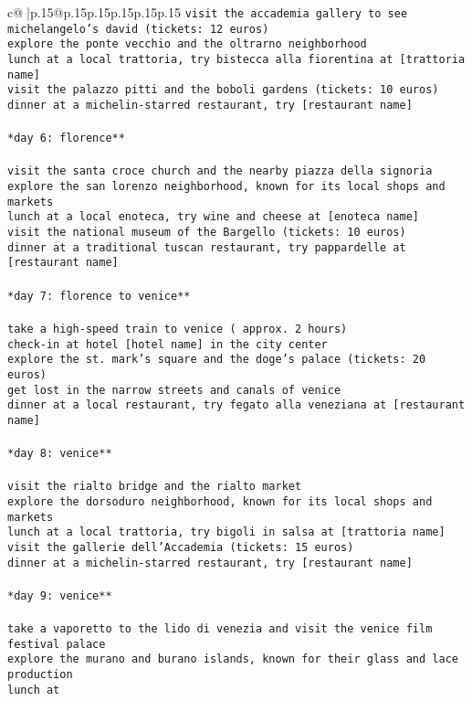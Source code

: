 \documentclass{article}
\begin{document}
{\begin{supertabular}{c@{$\;$}|p{.15\linewidth}@{}p{.15\linewidth}p{.15\linewidth}p{.15\linewidth}p{.15\linewidth}p{.15\linewidth}}
{{{\tt * visit the accademia gallery to see michelangelo's david (tickets: 12 euros)\\ \tt * explore the ponte vecchio and the oltrarno neighborhood\\ \tt * lunch at a local trattoria, try bistecca alla fiorentina at [trattoria name]\\ \tt * visit the palazzo pitti and the boboli gardens (tickets: 10 euros)\\ \tt * dinner at a michelin-starred restaurant, try [restaurant name]\\ \tt \\ \tt **day 6: florence**\\ \tt \\ \tt * visit the santa croce church and the nearby piazza della signoria\\ \tt * explore the san lorenzo neighborhood, known for its local shops and markets\\ \tt * lunch at a local enoteca, try wine and cheese at [enoteca name]\\ \tt * visit the national museum of the Bargello (tickets: 10 euros)\\ \tt * dinner at a traditional tuscan restaurant, try pappardelle at [restaurant name]\\ \tt \\ \tt **day 7: florence to venice**\\ \tt \\ \tt * take a high-speed train to venice ( approx. 2 hours)\\ \tt * check-in at hotel [hotel name] in the city center\\ \tt * explore the st. mark's square and the doge's palace (tickets: 20 euros)\\ \tt * get lost in the narrow streets and canals of venice\\ \tt * dinner at a local restaurant, try fegato alla veneziana at [restaurant name]\\ \tt \\ \tt **day 8: venice**\\ \tt \\ \tt * visit the rialto bridge and the rialto market\\ \tt * explore the dorsoduro neighborhood, known for its local shops and markets\\ \tt * lunch at a local trattoria, try bigoli in salsa at [trattoria name]\\ \tt * visit the gallerie dell'Accademia (tickets: 15 euros)\\ \tt * dinner at a michelin-starred restaurant, try [restaurant name]\\ \tt \\ \tt **day 9: venice**\\ \tt \\ \tt * take a vaporetto to the lido di venezia and visit the venice film festival palace\\ \tt * explore the murano and burano islands, known for their glass and lace production\\ \tt * lunch at }}}
\end{supertabular}}
\end{document}
